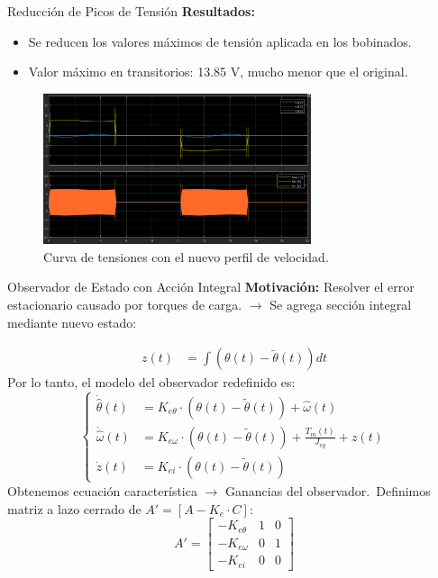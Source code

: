 \documentclass[12pt]{beamer}
\begin{document}
\begin{frame}{Reducción de Picos de Tensión}
    \textbf{Resultados:}
    \begin{itemize}
        \item Se reducen los valores máximos de tensión aplicada en los bobinados.
        \item Valor máximo en transitorios: 13.85 V, mucho menor que el original.
    \end{itemize}
    \begin{figure}
        \centering
        \includegraphics[width=0.7\textwidth]{Imagenes/Tensiones_velocidad_trapezoidal.png}
        \caption{Curva de tensiones con el nuevo perfil de velocidad.}
        \label{fig:Tensiones_velocidad_trapezoidal}
    \end{figure}
\end{frame}



\begin{frame}{Observador de Estado con Acción Integral}\small
\textbf{Motivación:} Resolver el error estacionario causado por torques de carga. $\rightarrow$ Se agrega sección integral mediante nuevo estado:

\begin{equation}
\begin{aligned}
z(t) &= \int (\theta(t) - \tilde{\theta}(t)) dt
\end{aligned}
\end{equation}
Por lo tanto, el modelo del observador redefinido es:
\begin{equation}
\left\{
\begin{aligned}
\dot{\hat{\theta}}(t) &= K_{e\theta} \cdot (\theta(t) - \tilde{\theta}(t)) + \hat{\omega}(t) \\
\dot{\hat{\omega}}(t) &= K_{e\omega} \cdot (\theta(t) - \tilde{\theta}(t)) + \frac{T_m(t)}{J_{eq}} + z(t) \\
\dot{z}(t) &= K_{ei} \cdot (\theta(t) - \tilde{\theta}(t))
\end{aligned}
\right.
\end{equation}
Obtenemos ecuación característica $\rightarrow$ Ganancias del observador.\
Definimos matriz a lazo cerrado de $A' = [A - K_e \cdot C]$:
\begin{equation}
A' = \begin{bmatrix}
-K_{e\theta} & 1 & 0 \\
-K_{e\omega} & 0 & 1 \\
-K_{ei} & 0 & 0
\end{bmatrix}
\end{equation}
\end{frame}
\end{document}
